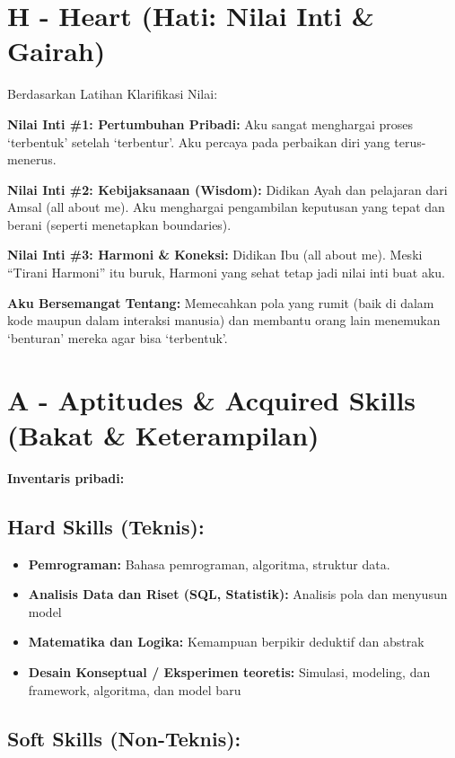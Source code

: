 \documentclass[
  letterpaper,
  DIV=11,
  numbers=noendperiod]{scrreprt}
\providecommand{\tightlist}{%
  \setlength{\itemsep}{0pt}\setlength{\parskip}{0pt}}
\begin{document}
\section{H - Heart (Hati: Nilai Inti \&
Gairah)}\label{h---heart-hati-nilai-inti-gairah}

Berdasarkan Latihan Klarifikasi Nilai:

\textbf{Nilai Inti \#1: Pertumbuhan Pribadi:} Aku sangat menghargai
proses `terbentuk' setelah `terbentur'. Aku percaya pada perbaikan diri
yang terus-menerus.

\textbf{Nilai Inti \#2: Kebijaksanaan (Wisdom):} Didikan Ayah dan
pelajaran dari Amsal (all about me). Aku menghargai pengambilan
keputusan yang tepat dan berani (seperti menetapkan boundaries).

\textbf{Nilai Inti \#3: Harmoni \& Koneksi:} Didikan Ibu (all about me).
Meski ``Tirani Harmoni'' itu buruk, Harmoni yang sehat tetap jadi nilai
inti buat aku.

\textbf{Aku Bersemangat Tentang:} Memecahkan pola yang rumit (baik di
dalam kode maupun dalam interaksi manusia) dan membantu orang lain
menemukan `benturan' mereka agar bisa `terbentuk'.

\section{A - Aptitudes \& Acquired Skills (Bakat \&
Keterampilan)}\label{a---aptitudes-acquired-skills-bakat-keterampilan}

\textbf{Inventaris pribadi:}

\subsection{Hard Skills (Teknis):}\label{hard-skills-teknis}

\begin{itemize}
\tightlist
\item
  \textbf{Pemrograman:} Bahasa pemrograman, algoritma, struktur data.
\item
  \textbf{Analisis Data dan Riset (SQL, Statistik):} Analisis pola dan
  menyusun model
\item
  \textbf{Matematika dan Logika:} Kemampuan berpikir deduktif dan
  abstrak
\item
  \textbf{Desain Konseptual / Eksperimen teoretis:} Simulasi, modeling,
  dan framework, algoritma, dan model baru
\end{itemize}

\subsection{Soft Skills (Non-Teknis):}\label{soft-skills-non-teknis}
\end{document}
